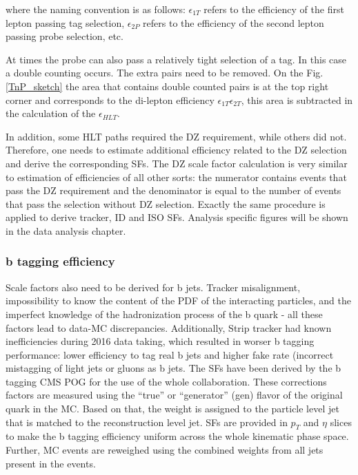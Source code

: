 \begin{small}
\noindent where the naming convention is as follows: $\epsilon_{1T}$ refers to the efficiency of the first lepton passing tag selection, $\epsilon_{2P}$ refers to the efficiency of the second lepton passing probe selection, etc. 

At times the probe can also pass a relatively tight selection of a tag. In this case a double counting occurs. The extra pairs need to be removed. On the Fig. \ref{TnP_sketch} the area that contains double counted pairs is at the top right corner and corresponds to the di-lepton efficiency $\epsilon_{1T}\epsilon_{2T}$, this area is subtracted in the calculation of the $\epsilon_{HLT}$.

In addition, some HLT paths required the DZ requirement, while others did not. Therefore, one needs to estimate additional efficiency related to the DZ selection and derive the corresponding SFs. The DZ scale factor calculation is very similar to estimation of efficiencies of all other sorts: the numerator contains events that pass the DZ requirement and the denominator is equal to the number of events that pass the selection without DZ selection. Exactly the same procedure is applied to derive tracker, ID and ISO SFs. Analysis specific figures will be shown in the data analysis chapter. 

\subsubsection{b tagging efficiency}\label{sec:b_tagging}

Scale factors also need to be derived for b jets. Tracker misalignment, impossibility to know the content of the PDF of the interacting particles, and the imperfect knowledge of the hadronization process of the b quark - all these factors lead to data-MC discrepancies. Additionally, Strip tracker had known inefficiencies during 2016 data taking, which resulted in worser b tagging performance: lower efficiency to tag real b jets and higher fake rate (incorrect mistagging of light jets or gluons as b jets. The SFs have been derived by the b tagging CMS POG for the use of the whole collaboration. These corrections factors are measured using the ``true'' or ``generator'' (gen) flavor of the original quark in the MC. Based on that, the weight is assigned to the particle level jet that is matched to the reconstruction level jet. SFs are provided in $p_T$ and $\eta$ slices to make the b tagging efficiency uniform across the whole kinematic phase space.
Further, MC events are reweighed using the combined weights from all jets present in the events. 


\end{small}
